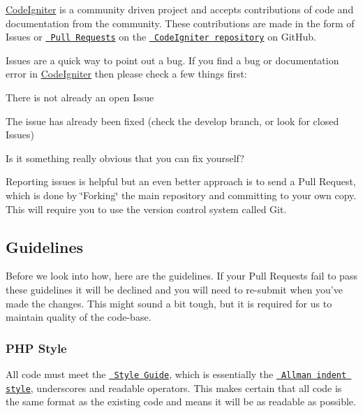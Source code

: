 \mbox{\hyperlink{namespace_code_igniter}{Code\+Igniter}} is a community driven project and accepts contributions of code and documentation from the community. These contributions are made in the form of Issues or \href{http://help.github.com/send-pull-requests/}{\texttt{ Pull Requests}} on the \href{https://github.com/bcit-ci/CodeIgniter}{\texttt{ Code\+Igniter repository}} on Git\+Hub.

Issues are a quick way to point out a bug. If you find a bug or documentation error in \mbox{\hyperlink{namespace_code_igniter}{Code\+Igniter}} then please check a few things first\+:


\begin{DoxyEnumerate}
\item There is not already an open Issue
\item The issue has already been fixed (check the develop branch, or look for closed Issues)
\item Is it something really obvious that you can fix yourself?
\end{DoxyEnumerate}

Reporting issues is helpful but an even better approach is to send a Pull Request, which is done by \char`\"{}\+Forking\char`\"{} the main repository and committing to your own copy. This will require you to use the version control system called Git.

\subsection*{Guidelines}

Before we look into how, here are the guidelines. If your Pull Requests fail to pass these guidelines it will be declined and you will need to re-\/submit when you’ve made the changes. This might sound a bit tough, but it is required for us to maintain quality of the code-\/base.

\subsubsection*{P\+HP Style}

All code must meet the \href{https://codeigniter.com/user_guide/general/styleguide.html}{\texttt{ Style Guide}}, which is essentially the \href{https://en.wikipedia.org/wiki/Indent_style\#Allman_style}{\texttt{ Allman indent style}}, underscores and readable operators. This makes certain that all code is the same format as the existing code and means it will be as readable as possible.


